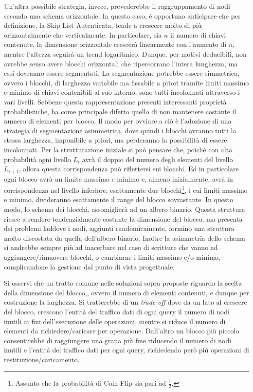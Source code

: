 		Un'altra possibile strategia, invece, prevederebbe il raggruppamento di nodi secondo uno schema orizzontale. In questo caso, è opportuno anticipare che per definizione, la Skip List Autenticata, tende a crescere molto di più orizzontalmente che verticalmente. In particolare, sia $ n $ il numero di chiavi contenute, la dimensione orizzontale crescerà linearmente con l'aumento di $ n $, mentre l'altezza seguirà un trend logaritmico. Dunque, per motivi deducibili, non avrebbe senso avere blocchi orizzontali che ripercorrano l'intera lunghezza, ma essi dovranno essere segmentati. La segmentazione potrebbe essere simmetrica, ovvero i blocchi, di larghezza variabile ma fissabile a priori tramite limiti massimo e minimo di chiavi contenibili al suo interno, sono tutti incolonnati attraverso i vari livelli. Sebbene questa rappresentazione presenti interessanti proprietà probabilistiche, ha come principale difetto quello di non mantenere costante il numero di elementi per blocco. Il modo per ovviare a ciò è l'adozione di una strategia di segmentazione asimmetrica, dove quindi i blocchi avranno tutti la stessa larghezza, imponibile a priori, ma perderanno la possibilità di essere incolonnati. Per la strutturazione iniziale si può pensare che, poiché con alta probabilità ogni livello $ L_{i} $ avrà il doppio del numero degli elementi del livello $ L_{i+1} $, allora questa corrispondenza può riflettersi sui blocchi. Ed in particolare ogni blocco avrà un limite massimo e minimo e, almeno inizialmente, avrà in corrispondenza nel livello inferiore, esattamente due blocchi\footnote{Assunto che la probabilità di Coin Flip sia pari ad $ \frac{1}{2} $.}, i cui limiti massimo e minimo, divideranno esattamente il range del blocco sovrastante. In questo modo, lo schema dei blocchi, assomiglierà ad un albero binario. Questa struttura riesce a rendere tendenzialmente costante la dimensione del blocco, ma presenta dei problemi laddove i nodi, aggiunti randomicamente, formino una struttura molto discostata da quella dell'albero binario. Inoltre la asimmetria dello schema si andrebbe sempre più ad inacerbare nel caso di scritture che vanno ad aggiungere/rimuovere blocchi, o cambiarne i limiti massimo e/o minimo, complicandone la gestione dal punto di vista progettuale.
		
		Si osservi che un tratto comune nelle soluzioni sopra proposte riguarda la scelta della dimensione del blocco,, ovvero il numero di elementi contenuti, e dunque per costruzione la larghezza. Si tratterebbe di un \textit{trade-off} dove da un lato al crescere del blocco, crescono l'entità del traffico dati di ogni query il numero di nodi inutili ai fini dell'esecuzione delle operazioni, mentre si riduce il numero di elementi da richiedere/caricare per operazione. Dall'altro un blocco più piccolo consentirebbe di raggiungere una grana più fine riducendo il numero di nodi inutili e l'entità del traffico dati per ogni query, richiedendo però più operazioni di restituzione/caricamento.
		
